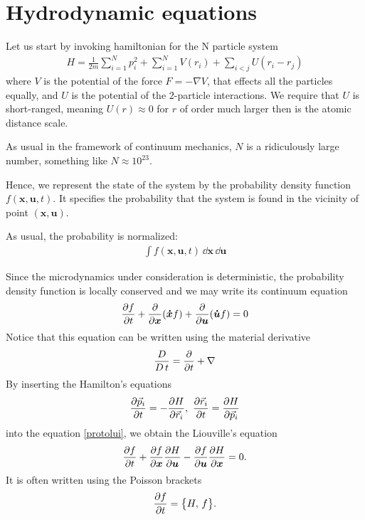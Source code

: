 \chapter{Hydrodynamic equations}
Let us start by invoking hamiltonian for the N particle system
\begin{align*}
H = \frac{1}{2m} \sum_{i=1}^N p_i^2 + \sum_{i=1}^N V(r_i) + \sum_{i<j} U(r_i - r_j)
\end{align*}
where $V$ is the potential of the force $F= -\nabla V$, that effects all the particles equally, and $U$ is the potential of the $2$-particle interactions. We require that $U$ is short-ranged, meaning $U(r) \approx 0$ for $r$ of order much larger then is the atomic distance scale.

As usual in the framework of continuum mechanics, $N$ is a ridiculously large number, something like $N \approx 10^{23}$.

Hence, we represent the state of the system by the probability density function $f(\bm{x},\bm{u},t)$. It specifies the probability that the system is found in the vicinity of point $(\bm{x},\bm{u})$.

As usual, the probability is normalized:
\begin{align*}
\int f(\bm{x},\bm{u},t) \, \dd\bm{x} \, \dd\bm{u}
\end{align*}

Since the microdynamics under consideration is deterministic, the probability density function is locally conserved and we may write its continuum equation
\begin{align} \label{protolui}
\frac{\partial f}{\partial t} + \frac{\partial}{\partial \bm{x}} (\bm{\dot{x}} f) + \frac{\partial}{\partial \bm{u}} (\bm{\dot{u}} f) = 0
\end{align}
Notice that this equation can be written using the material derivative
\begin{align*}
\frac{D}{D\,t} = \frac{\partial}{\partial t} + \nabla
\end{align*}
By inserting the Hamilton's equations 
\begin{align*}
\frac{\partial \vec{p}_i}{\partial t} = - \frac{\partial H}{\partial \vec{r}_i},~ \frac{\partial \vec{r}_i}{\partial t} = \frac{\partial H}{\partial \vec{p}_i}
\end{align*}
into the equation \ref{protolui}, we obtain the Liouville's equation
\begin{align*}
\frac{\partial f}{\partial t} + \frac{\partial f}{\partial \bm{x}} \frac{\partial H}{\partial \bm{u}} - \frac{\partial f}{\partial \bm{u}}\frac{\partial H}{\partial \bm{x}} = 0.
\end{align*}
It is often written using the Poisson brackets
\begin{align} \label{lui}
\frac{\partial f}{\partial t} = \big\{ H, \, f \big\}.
\end{align}


